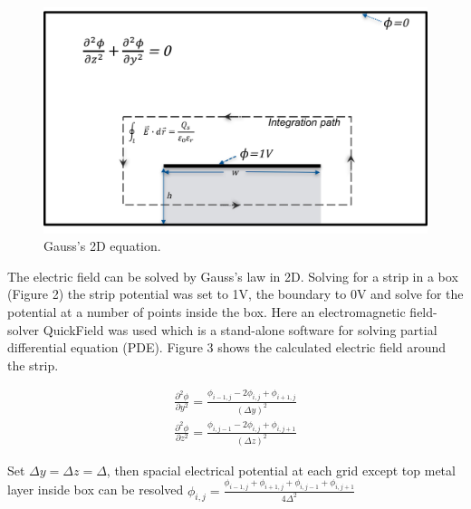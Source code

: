\documentclass[11pt,final]{scrbook}
\begin{document}
\begin{figure}[htbp]
\begin{center}
\includegraphics[scale=0.5]{images/Gauss2D.pdf}
\caption{Gauss's 2D equation.}
\label{fig:Gauss2D}
\end{center}
\end{figure}

The electric field can be solved by Gauss’s law in 2D. Solving for a strip in a box (Figure 2) the strip potential was set to 1V, the boundary to 0V and solve for the potential at a number of points inside the box. Here an electromagnetic field-solver QuickField was used which is a stand-alone software for solving partial differential equation (PDE). Figure 3 shows the calculated electric field around the strip.

\begin{align}
\frac { { \partial  }^{ 2 }\phi  }{ \partial { y }^{ 2 } } =\frac { { \phi  }_{ i-1,j }-2{ \phi  }_{ i,j }+{ \phi  }_{ i+1,j } }{ { (\Delta y) }^{ 2 } }\\
\frac { { \partial  }^{ 2 }\phi  }{ \partial { z }^{ 2 } } =\frac { { \phi  }_{ i,j-1 }-2{ \phi  }_{ i,j }+{ \phi  }_{ i,j+1 } }{ { (\Delta z) }^{ 2 } }
\end{align}

Set $\Delta y=\Delta z=\Delta$, then spacial electrical potential at each grid except top metal layer inside box can be resolved $ { \phi  }_{ i,j }=\frac { { \phi  }_{ i-1,j }+{ \phi  }_{ i+1,j }+{ \phi  }_{ i,j-1 }+{ \phi  }_{ i,j+1 } }{ 4\Delta ^{ 2 } } $
\end{document}
